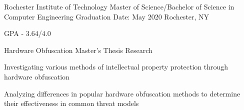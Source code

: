 
\begin{cventries}
  \cvexperience
	{Rochester Institute of Technology}
	{Master of Science/Bachelor of Science in Computer Engineering}
    {Graduation Date: May 2020}
    {Rochester, NY}
    {
      \begin{cvitems}
	  \item {GPA - 3.64/4.0}
      \end{cvitems}
    }

  \cvexperience
  {Hardware Obfuscation}
	{Master's Thesis Research}
    {}
    {}
    {
		\begin{cvitems}
		\item Investigating various methods of intellectual property protection through hardware obfuscation
		\item Analyzing differences in popular hardware obfuscation methods to determine their effectiveness in common threat models
		\end{cvitems}
    }

\end{cventries}
